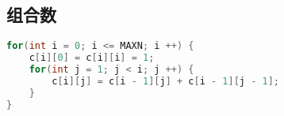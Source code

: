 \subsection{组合数}
    \begin{lstlisting}[language=c++]
for(int i = 0; i <= MAXN; i ++) {
    c[i][0] = c[i][i] = 1;
    for(int j = 1; j < i; j ++) {
        c[i][j] = c[i - 1][j] + c[i - 1][j - 1];
    }
}
    \end{lstlisting}
